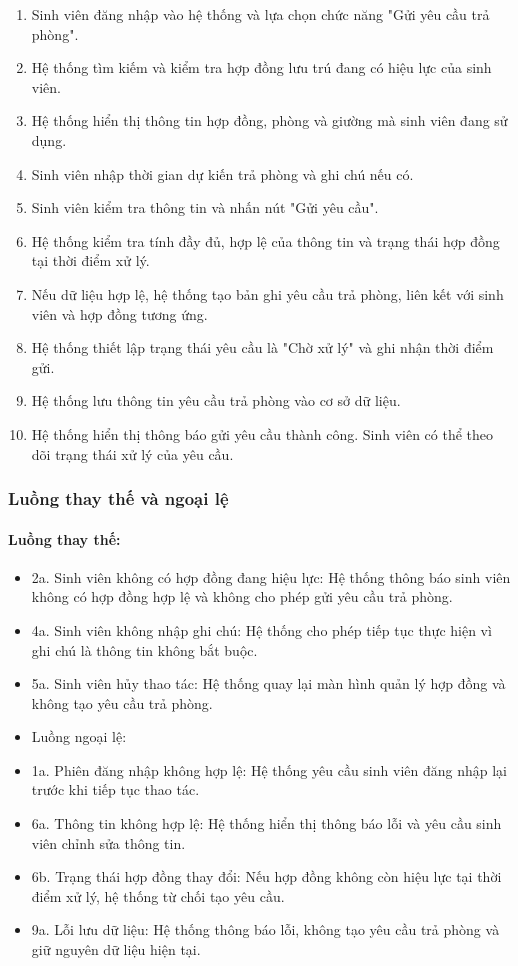 \begin{enumerate}[leftmargin=1.6em]
\item Sinh viên đăng nhập vào hệ thống và lựa chọn chức năng "Gửi yêu cầu trả phòng".
\item Hệ thống tìm kiếm và kiểm tra hợp đồng lưu trú đang có hiệu lực của sinh viên.
\item Hệ thống hiển thị thông tin hợp đồng, phòng và giường mà sinh viên đang sử dụng.
\item Sinh viên nhập thời gian dự kiến trả phòng và ghi chú nếu có.
\item Sinh viên kiểm tra thông tin và nhấn nút "Gửi yêu cầu".
\item Hệ thống kiểm tra tính đầy đủ, hợp lệ của thông tin và trạng thái hợp đồng tại thời điểm xử lý.
\item Nếu dữ liệu hợp lệ, hệ thống tạo bản ghi yêu cầu trả phòng, liên kết với sinh viên và hợp đồng tương ứng.
\item Hệ thống thiết lập trạng thái yêu cầu là "Chờ xử lý" và ghi nhận thời điểm gửi.
\item Hệ thống lưu thông tin yêu cầu trả phòng vào cơ sở dữ liệu.
\item Hệ thống hiển thị thông báo gửi yêu cầu thành công. Sinh viên có thể theo dõi trạng thái xử lý của yêu cầu.
\end{enumerate}

\subsubsection{Luồng thay thế và ngoại lệ}

\paragraph{Luồng thay thế:}

\begin{itemize}[leftmargin=1.4em]
\item 2a. Sinh viên không có hợp đồng đang hiệu lực: Hệ thống thông báo sinh viên không có hợp đồng hợp lệ và không cho phép gửi yêu cầu trả phòng.
\item 4a. Sinh viên không nhập ghi chú: Hệ thống cho phép tiếp tục thực hiện vì ghi chú là thông tin không bắt buộc.
\item 5a. Sinh viên hủy thao tác: Hệ thống quay lại màn hình quản lý hợp đồng và không tạo yêu cầu trả phòng.
\item Luồng ngoại lệ:
\item 1a. Phiên đăng nhập không hợp lệ: Hệ thống yêu cầu sinh viên đăng nhập lại trước khi tiếp tục thao tác.
\item 6a. Thông tin không hợp lệ: Hệ thống hiển thị thông báo lỗi và yêu cầu sinh viên chỉnh sửa thông tin.
\item 6b. Trạng thái hợp đồng thay đổi: Nếu hợp đồng không còn hiệu lực tại thời điểm xử lý, hệ thống từ chối tạo yêu cầu.
\item 9a. Lỗi lưu dữ liệu: Hệ thống thông báo lỗi, không tạo yêu cầu trả phòng và giữ nguyên dữ liệu hiện tại.
\end{itemize}

